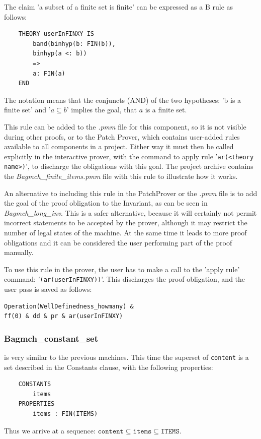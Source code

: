 \documentclass[12pt,journal,duplex]{IEEEtran}
\begin{document}
	The claim 'a subset of a finite set is finite' can be expressed as a B rule as follows:

	\begin{lstlisting}
	THEORY userInFINXY IS
		band(binhyp(b: FIN(b)),
		binhyp(a <: b))
		=>
		a: FIN(a)
	END
	\end{lstlisting}

	The notation means that the conjuncts (AND) of the two hypotheses: 'b is a finite set' and '$a \subseteq b$' implies the goal, that $a$ is a finite set.

	This rule can be added to the \emph{.pmm} file for this component, so it is not visible during other proofs, or to the Patch Prover, which contains user-added rules available to all components in a project. Either way it must then be called explicitly in the interactive prover, with the command to apply rule '\texttt{ar(<theory name>)}', to discharge the obligations with this goal. The project archive contains the \emph{Bagmch\_finite\_items.pmm} file with this rule to illustrate how it works.

	An alternative to including this rule in the PatchProver or the \emph{.pmm} file is to add the goal of the proof obligation to the Invariant, as can be seen in \emph{Bagmch\_long\_inv}. This is a safer alternative, because it will certainly not permit incorrect statements to be accepted by the prover, although it may restrict the number of legal states of the machine. At the same time it leads to more proof obligations and it can be considered the user performing part of the proof manually.

	To use this rule in the prover, the user has to make a call to the 'apply rule' command: '\texttt{(ar(userInFINXY))}'. This discharges the proof obligation, and the user pass is saved as follows:
\begin{lstlisting}
Operation(WellDefinedness_howmany) &
ff(0) & dd & pr & ar(userInFINXY)
	\end{lstlisting}

	\subsubsection{Bagmch\_constant\_set} is very similar to the previous machines. This time the superset of \texttt{content} is a set described in the Constants clause, with the following properties:

	\begin{lstlisting}
	CONSTANTS
		items
	PROPERTIES
		items : FIN(ITEMS)
	\end{lstlisting}
	Thus we arrive at a sequence: $\texttt{content} \subseteq \texttt{items} \subseteq \texttt{ITEMS}$.
\end{document}
